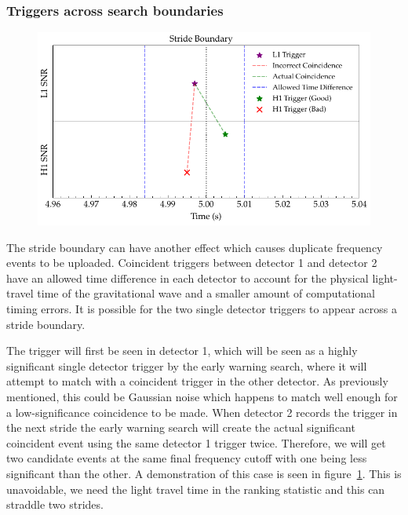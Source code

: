 \subsubsection{\label{6:sec:trigs-across-bounds}Triggers across search boundaries}
%
\begin{figure}
       \centering
    \includegraphics[width=\textwidth]{images/6_earlywarning/identified-problems/trigs_across_bounds.pdf}
    \caption{}
    \label{6:fig:triggers_across_boundaries}
\end{figure}
%
The stride boundary can have another effect which causes duplicate frequency events to be uploaded. Coincident triggers between detector 1 and detector 2 have an allowed time difference in each detector to account for the physical light-travel time of the gravitational wave and a smaller amount of computational timing errors. It is possible for the two single detector triggers to appear across a stride boundary.

The trigger will first be seen in detector 1, which will be seen as a highly significant single detector trigger by the early warning search, where it will attempt to match with a coincident trigger in the other detector. As previously mentioned, this could be Gaussian noise which happens to match well enough for a low-significance coincidence to be made. When detector 2 records the trigger in the next stride the early warning search will create the actual significant coincident event using the same detector 1 trigger twice. Therefore, we will get two candidate events at the same final frequency cutoff with one being less significant than the other. A demonstration of this case is seen in figure~\ref{6:fig:triggers_across_boundaries}. This is unavoidable, we need the light travel time in the ranking statistic and this can straddle two strides.

